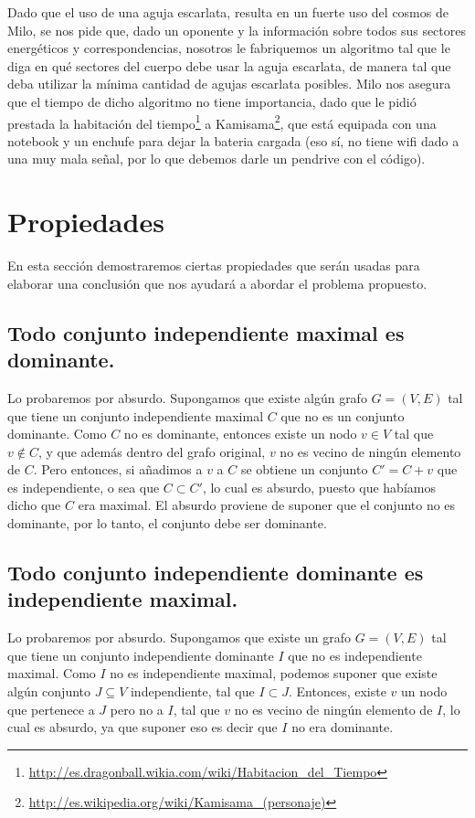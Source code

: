\documentclass[a4paper]{article}
\begin{document}
Dado que el uso de una aguja escarlata, resulta en un fuerte uso del cosmos de Milo, se nos pide que, dado un oponente y la información sobre todos sus sectores energéticos y correspondencias, nosotros le fabriquemos un algoritmo tal que le diga en qué sectores del cuerpo debe usar la aguja escarlata, de manera tal que deba utilizar la mínima cantidad de agujas escarlata posibles. Milo nos asegura que el tiempo de dicho algoritmo no tiene importancia, dado que le pidió prestada la habitación del tiempo\footnote{\url{http://es.dragonball.wikia.com/wiki/Habitacion_del_Tiempo}} a Kamisama\footnote{\url{http://es.wikipedia.org/wiki/Kamisama_(personaje)}}, que está equipada con una notebook y un enchufe para dejar la bateria cargada (eso sí, no tiene wifi dado a una muy mala señal, por lo que debemos darle un pendrive con el código).


\vspace*{0.6cm}

\section{Propiedades}

\vspace*{0.3cm}

En esta sección demostraremos ciertas propiedades que serán usadas para elaborar una conclusión que nos ayudará a abordar el problema propuesto.

\subsection{Todo conjunto independiente maximal es dominante.}
Lo probaremos por absurdo.  Supongamos que existe algún grafo $G = (V,E)$ tal que tiene un conjunto independiente maximal $C$ que no es un conjunto dominante. Como $C$ no es dominante, entonces existe un nodo $v \in V$ tal que $v \not \in C$, y que además dentro del grafo original, $v$ no es vecino de ningún elemento de $C$. Pero entonces, si añadimos a $v$ a $C$ se obtiene un conjunto $C' = {C + v}$ que es independiente, o sea que $C \subset C'$, lo cual es absurdo, puesto que habíamos dicho que $C$ era maximal. El absurdo proviene de suponer que el conjunto no es dominante, por lo tanto, el conjunto debe ser dominante.

\subsection{Todo conjunto independiente dominante es independiente maximal.}
Lo probaremos por absurdo.  Supongamos que existe un grafo $G = (V,E)$ tal que tiene un conjunto independiente dominante $I$ que no es independiente maximal. Como $I$ no es independiente maximal, podemos suponer que existe algún conjunto $J \subseteq V$ independiente, tal que $I \subset J$. Entonces, existe $v$ un nodo que pertenece a $J$ pero no a $I$, tal que $v$ no es vecino de ningún elemento de $I$, lo cual es absurdo, ya que suponer eso es decir que $I$ no era dominante. 
\end{document}
